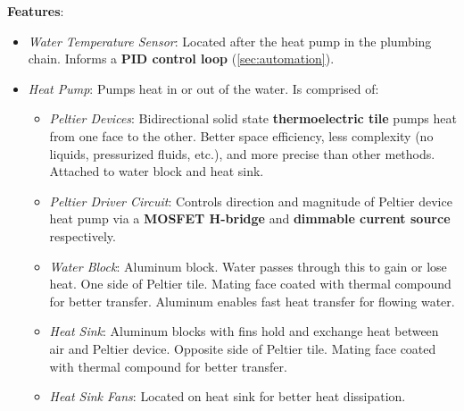\textbf{Features}:
\begin{itemize}
    \item \textit{Water Temperature Sensor}: Located after the heat pump in the plumbing chain. Informs a \textbf{PID control loop} (\ref{sec:automation}).
    \item \textit{Heat Pump}: Pumps heat in or out of the water. Is comprised of:
    \begin{itemize}
        \item \textit{Peltier Devices}: Bidirectional solid state \textbf{thermoelectric tile} pumps heat from one face to the other. Better space efficiency, less complexity (no liquids, pressurized fluids, etc.), and more precise than other methods. Attached to water block and heat sink.
        \item \textit{Peltier Driver Circuit}: Controls direction and magnitude of Peltier device heat pump via a \textbf{MOSFET H-bridge} and \textbf{dimmable current source} respectively.
        \item \textit{Water Block}: Aluminum block. Water passes through this to gain or lose heat. One side of Peltier tile. Mating face coated with thermal compound for better transfer. Aluminum enables fast heat transfer for flowing water.
        \item \textit{Heat Sink}: Aluminum blocks with fins hold and exchange heat between air and Peltier device. Opposite side of Peltier tile. Mating face coated with thermal compound for better transfer.
        \item \textit{Heat Sink Fans}: Located on heat sink for better heat dissipation.
    \end{itemize}
\end{itemize}